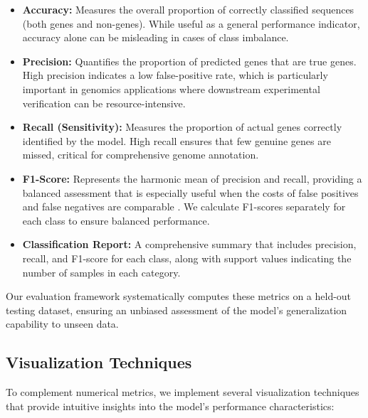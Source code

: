 \documentclass[
	a4paper, %
	10pt, %
	unnumberedsections, %
	twoside, %
]{LTJournalArticle}
\begin{document}
\begin{itemize}
    \item \textbf{Accuracy:} Measures the overall proportion of correctly classified sequences (both genes and non-genes). While useful as a general performance indicator, accuracy alone can be misleading in cases of class imbalance.
    
    \item \textbf{Precision:} Quantifies the proportion of predicted genes that are true genes. High precision indicates a low false-positive rate, which is particularly important in genomics applications where downstream experimental verification can be resource-intensive.
    
    \item \textbf{Recall (Sensitivity):} Measures the proportion of actual genes correctly identified by the model. High recall ensures that few genuine genes are missed, critical for comprehensive genome annotation.
    
    \item \textbf{F1-Score:} Represents the harmonic mean of precision and recall, providing a balanced assessment that is especially useful when the costs of false positives and false negatives are comparable \cite{Chicco:2020}. We calculate F1-scores separately for each class to ensure balanced performance.
    
    \item \textbf{Classification Report:} A comprehensive summary that includes precision, recall, and F1-score for each class, along with support values indicating the number of samples in each category.
\end{itemize}

Our evaluation framework systematically computes these metrics on a held-out testing dataset, ensuring an unbiased assessment of the model's generalization capability to unseen data.

\subsection{Visualization Techniques}

To complement numerical metrics, we implement several visualization techniques that provide intuitive insights into the model's performance characteristics:
\end{document}
